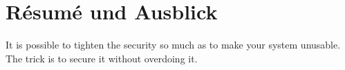 \section{Résumé und Ausblick}
\kant[4-5]\autocite{example}

\begin{quoting}
	\centering
	It is possible\autocite{example} to tighten the security so much as to make your system unusable. The trick is to secure it without overdoing it.\autocite{example}
\end{quoting}

